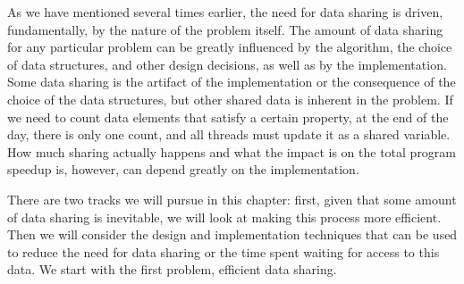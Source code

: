As we have mentioned several times earlier, the need for data sharing is driven, fundamentally, by the nature of the problem itself. The amount of data sharing for any particular problem can be greatly influenced by the algorithm, the choice of data structures, and other design decisions, as well as by the implementation. Some data sharing is the artifact of the implementation or the consequence of the choice of the data structures, but other shared data is inherent in the problem. If we need to count data elements that satisfy a certain property, at the end of the day, there is only one count, and all threads must update it as a shared variable. How much sharing actually happens and what the impact is on the total program speedup is, however, can depend greatly on the implementation.

There are two tracks we will pursue in this chapter: first, given that some amount of data sharing is inevitable, we will look at making this process more efficient. Then we will consider the design and implementation techniques that can be used to reduce the need for data sharing or the time spent waiting for access to this data. We start with the first problem, efficient data sharing.

































